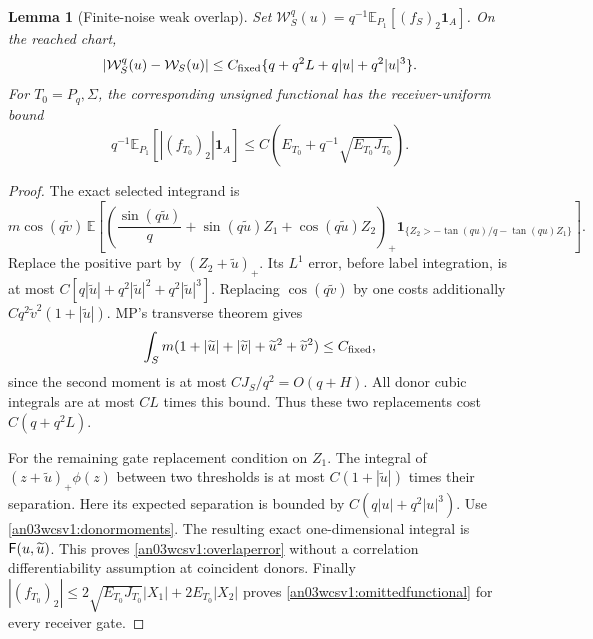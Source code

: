 \documentclass[11pt]{article}
\numberwithin{equation}{section}
\newtheorem{lemma}[theorem]{Lemma}\newtheorem{proposition}[theorem]{Proposition}
\theoremstyle{remark}\newtheorem{remark}[theorem]{Remark}
\newcommand{\E}{\mathbb E}\newcommand{\dd}{\,d}\newcommand{\one}{\mathbf1}
\begin{document}
\begin{lemma}[Finite-noise weak overlap]
\label{an03wcsv1:overlap}
Set $\mathcal W_S^q(u)=q^{-1}\E_{P_1}[(f_S)_2\one_A]$.
On the reached chart,
\begin{equation}
 |\mathcal W_S^q(u)-\mathcal W_S(u)|
 \le C_{\rm fixed}\{q+q^2L+q|u|+q^2|u|^3\}.
 \label{an03wcsv1:overlaperror}
\end{equation}
For $T_0=P_q,\Sigma$, the corresponding unsigned functional
has the receiver-uniform bound
\begin{equation}
 q^{-1}\E_{P_1}[|(f_{T_0})_2|\one_A]
 \le C(E_{T_0}+q^{-1}\sqrt{E_{T_0}J_{T_0}}).
 \label{an03wcsv1:omittedfunctional}
\end{equation}
\end{lemma}
\begin{proof}
The exact selected integrand is
\[
 m\cos(q\widetilde v)\,
 \E\left[\left(\frac{\sin(q\widetilde u)}q
       +\sin(q\widetilde u)Z_1+\cos(q\widetilde u)Z_2\right)_+
 \one_{\{Z_2>-\tan(qu)/q-\tan(qu)Z_1\}}\right].
\]
Replace the positive part by $(Z_2+\widetilde u)_+$.
Its $L^1$ error, before label integration, is at most
$C[q|\widetilde u|+q^2|\widetilde u|^2+q^2|\widetilde u|^3]$.
Replacing $\cos(q\widetilde v)$ by one costs additionally
$Cq^2\widetilde v^2(1+|\widetilde u|)$.
MP's transverse theorem gives
\begin{equation}
 \int_Sm(1+|\widetilde u|+|\widetilde v|
                    +\widetilde u^2+\widetilde v^2)\le C_{\rm fixed},
 \label{an03wcsv1:donormoments}
\end{equation}
since the second moment is at most $CJ_S/q^2=O(q+H)$.
All donor cubic integrals are at most $CL$ times this bound.
Thus these two replacements cost $C(q+q^2L)$.

For the remaining gate replacement condition on $Z_1$.
The integral of $(z+\widetilde u)_+\phi(z)$ between two thresholds
is at most $C(1+|\widetilde u|)$ times their separation.
Here its expected separation is bounded by
$C(q|u|+q^2|u|^3)$. Use \eqref{an03wcsv1:donormoments}.
The resulting exact one-dimensional integral is
$\mathsf F(u,\widetilde u)$. This proves \eqref{an03wcsv1:overlaperror}
without a correlation differentiability assumption at coincident
donors. Finally
$|(f_{T_0})_2|\le2\sqrt{E_{T_0}J_{T_0}}|X_1|+2E_{T_0}|X_2|$
proves \eqref{an03wcsv1:omittedfunctional} for every receiver gate.
\end{proof}
\end{document}
